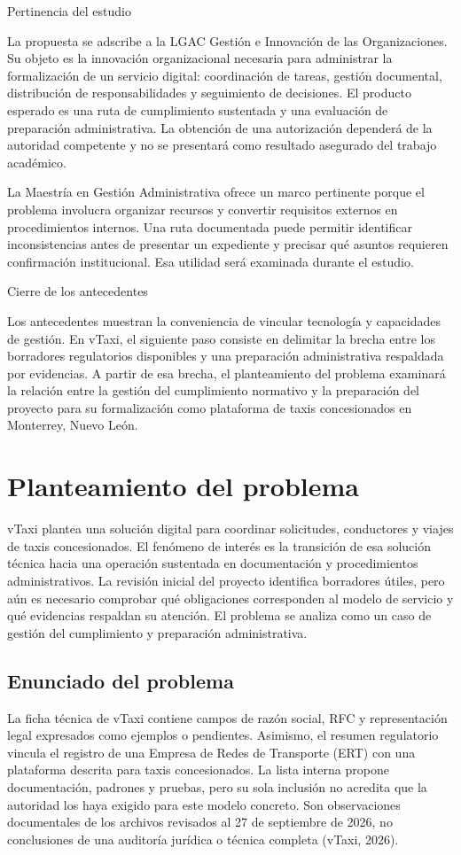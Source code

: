 {Pertinencia del estudio


La propuesta se adscribe a la LGAC Gestión e Innovación de las Organizaciones. Su objeto es la innovación organizacional necesaria para administrar la formalización de un servicio digital: coordinación de tareas, gestión documental, distribución de responsabilidades y seguimiento de decisiones. El producto esperado es una ruta de cumplimiento sustentada y una evaluación de preparación administrativa. La obtención de una autorización dependerá de la autoridad competente y no se presentará como resultado asegurado del trabajo académico.


La Maestría en Gestión Administrativa ofrece un marco pertinente porque el problema involucra organizar recursos y convertir requisitos externos en procedimientos internos. Una ruta documentada puede permitir identificar inconsistencias antes de presentar un expediente y precisar qué asuntos requieren confirmación institucional. Esa utilidad será examinada durante el estudio.


Cierre de los antecedentes


Los antecedentes muestran la conveniencia de vincular tecnología y capacidades de gestión. En vTaxi, el siguiente paso consiste en delimitar la brecha entre los borradores regulatorios disponibles y una preparación administrativa respaldada por evidencias. A partir de esa brecha, el planteamiento del problema examinará la relación entre la gestión del cumplimiento normativo y la preparación del proyecto para su formalización como plataforma de taxis concesionados en Monterrey, Nuevo León.


\section{Planteamiento del problema}
vTaxi plantea una solución digital para coordinar solicitudes, conductores y viajes de taxis concesionados. El fenómeno de interés es la transición de esa solución técnica hacia una operación sustentada en documentación y procedimientos administrativos. La revisión inicial del proyecto identifica borradores útiles, pero aún es necesario comprobar qué obligaciones corresponden al modelo de servicio y qué evidencias respaldan su atención. El problema se analiza como un caso de gestión del cumplimiento y preparación administrativa.


\subsection{Enunciado del problema}
La ficha técnica de vTaxi contiene campos de razón social, RFC y representación legal expresados como ejemplos o pendientes. Asimismo, el resumen regulatorio vincula el registro de una Empresa de Redes de Transporte (ERT) con una plataforma descrita para taxis concesionados. La lista interna propone documentación, padrones y pruebas, pero su sola inclusión no acredita que la autoridad los haya exigido para este modelo concreto. Son observaciones documentales de los archivos revisados al 27 de septiembre de 2026, no conclusiones de una auditoría jurídica o técnica completa (vTaxi, 2026).


}
